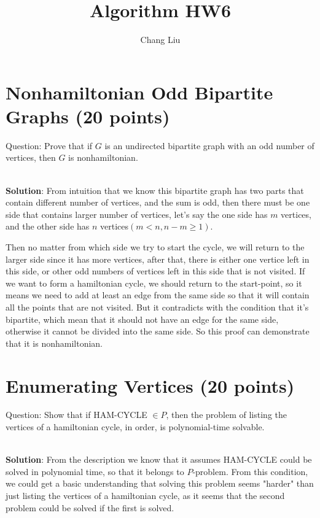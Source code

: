 \documentclass{article}
\author{Chang Liu}
\title{Algorithm HW6}
\begin{document}

\pagestyle{main}

\section{Nonhamiltonian Odd Bipartite Graphs (20 points)}
Question: Prove that if $G$ is an undirected bipartite graph with an odd number of vertices, then $G$ is nonhamiltonian.

~\\
\textbf{Solution}:\newline
\indent From intuition that we know this bipartite graph has two parts that contain different number of vertices, and the sum is odd, then there must be one side that contains larger number of vertices, let's say the one side has $m$ vertices, and the other side has $n$ vertices$(m<n, n - m \geq 1)$.

Then no matter from which side we try to start the cycle, we will return to the larger side since it has more vertices, after that, there is either one vertice left in this side, or other odd numbers of vertices left in this side that is not visited. If we want to form a hamiltonian cycle, we should return to the start-point, so it means we need to add at least an edge from the same side so that it will contain all the points that are not visited. But it contradicts with the condition that it's bipartite, which mean that it should not have an edge for the same side, otherwise it cannot be divided into the same side. So this proof can demonstrate that it is nonhamiltonian.

\section{Enumerating Vertices (20 points)}
Question: Show that if HAM-CYCLE $\in{P}$, then the problem of listing the vertices of a hamiltonian cycle, in order, is polynomial-time solvable.

~\\
\textbf{Solution}:\newline
\indent From the description we know that it assumes HAM-CYCLE could be solved in polynomial time, so that it belongs to $P$-problem. From this condition, we could get a basic understanding that solving this problem seems "harder" than just
listing the vertices of a hamiltonian cycle, as it seems that the second problem could be solved if the first is solved.
\end{document}
